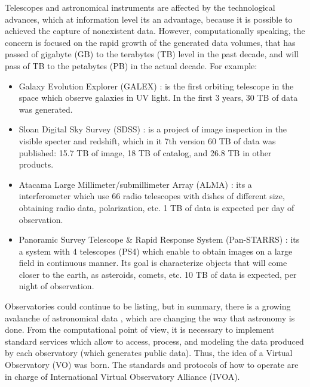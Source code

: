 Telescopes and astronomical instruments are affected by the technological
advances, which at information level its an advantage, because it is possible to
achieved the capture of nonexistent data.
However, computationally speaking, the concern is focused on
the rapid growth of the generated data volumes, that has passed of gigabyte
(GB) to the terabytes (TB) level in the past decade, and will pass of TB to the
petabytes (PB) in the actual decade. For example:
\begin{itemize}
	\item Galaxy Evolution Explorer (GALEX) \cite{galex}: is the first
orbiting telescope in the space which observe galaxies in UV light. In the
first 3 years, 30 TB of data was generated.
	\item Sloan Digital Sky Survey (SDSS) \cite{sloan}: is a project of
image inspection in the visible specter and redshift, which in it 7th version
60 TB of data was published: 15.7 TB of image, 18 TB of catalog, and 26.8 TB
in other products.
	\item Atacama Large Millimeter/submillimeter Array (ALMA) \cite{alma}:
its a interferometer which use 66 radio telescopes with dishes of different
size, obtaining radio data, polarization, etc. 1 TB of data is expected per
day of observation.
	\item Panoramic Survey Telescope \& Rapid Response System (Pan-STARRS)
\cite{pan}: its a system with 4 telescopes (PS4) which enable to obtain images
on a large field in continuous manner. Its goal is characterize objects that
will come closer to the earth, as asteroids, comets, etc. 10 TB of data is
expected, per night of observation.
\end{itemize}


Observatories could continue to be listing, but in summary, there is a growing
avalanche of astronomical data \cite{kborne}, which are changing the way that
astronomy is done. From the computational point of view, it is necessary to
implement standard services which allow to access, process, and modeling the
data produced by each observatory (which generates public data). Thus, the idea
of a Virtual Observatory (VO) was born. The standards and protocols of how to
operate are in charge of International Virtual Observatory Alliance (IVOA).

